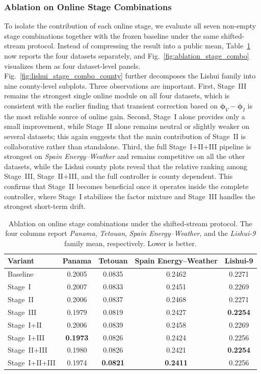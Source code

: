 ﻿\documentclass[journal]{IEEEtran}
\newenvironment{auditproblemblock}{\begingroup\color{red}}{\endgroup}
\begin{document}
\subsubsection{Ablation on Online Stage Combinations}
\begin{auditproblemblock}
To isolate the contribution of each online stage, we evaluate all seven non-empty stage combinations together with the frozen baseline under the same shifted-stream protocol. Instead of compressing the result into a public mean, Table~\ref{tab:ablation_stage_combo} now reports the four datasets separately, and Fig.~\ref{fig:ablation_stage_combo} visualizes them as four dataset-level panels. Fig.~\ref{fig:lishui_stage_combo_county} further decomposes the Lishui family into nine county-level subplots. Three observations are important. First, Stage~III remains the strongest single online module on all four datasets, which is consistent with the earlier finding that transient correction based on $\boldsymbol{\phi}_V-\boldsymbol{\phi}_I$ is the most reliable source of online gain. Second, Stage~I alone provides only a small improvement, while Stage~II alone remains neutral or slightly weaker on several datasets; this again suggests that the main contribution of Stage~II is collaborative rather than standalone. Third, the full Stage~I+II+III pipeline is strongest on \textit{Spain Energy--Weather} and remains competitive on all the other datasets, while the Lishui county plots reveal that the relative ranking among Stage~III, Stage~II+III, and the full controller is county dependent. This confirms that Stage~II becomes beneficial once it operates inside the complete controller, where Stage~I stabilizes the factor mixture and Stage~III handles the strongest short-term drift.

\begin{table}[t]
\caption{Ablation on online stage combinations under the shifted-stream protocol. The four columns report \textit{Panama}, \textit{Tetouan}, \textit{Spain Energy--Weather}, and the \textit{Lishui-9} family mean, respectively. Lower is better.}
\label{tab:ablation_stage_combo}
\centering
\begin{tabular}{lcccc}
\toprule
Variant & Panama & Tetouan & Spain Energy--Weather & Lishui-9 \\
\midrule
Baseline & 0.2005 & 0.0835 & 0.2462 & 0.2271 \\
Stage~I & 0.2007 & 0.0833 & 0.2451 & 0.2269 \\
Stage~II & 0.2006 & 0.0837 & 0.2468 & 0.2271 \\
Stage~III & 0.1979 & 0.0819 & 0.2427 & \textbf{0.2254} \\
Stage~I+II & 0.2006 & 0.0839 & 0.2458 & 0.2269 \\
Stage~I+III & \textbf{0.1973} & 0.0826 & 0.2424 & 0.2256 \\
Stage~II+III & 0.1980 & 0.0826 & 0.2421 & \textbf{0.2254} \\
Stage~I+II+III & 0.1974 & \textbf{0.0821} & \textbf{0.2411} & 0.2256 \\
\bottomrule
\end{tabular}
\end{table}


\end{auditproblemblock}
\end{document}
